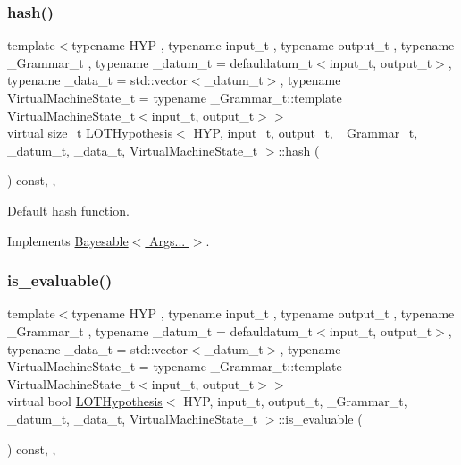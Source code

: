 \mbox{\label{class_l_o_t_hypothesis_a7c33d51f8d81762b1eca7f86b596236a}} 
\subsubsection{\texorpdfstring{hash()}{hash()}}
{\footnotesize\ttfamily template$<$typename H\+YP , typename input\+\_\+t , typename output\+\_\+t , typename \+\_\+\+Grammar\+\_\+t , typename \+\_\+datum\+\_\+t  = defauldatum\+\_\+t$<$input\+\_\+t, output\+\_\+t$>$, typename \+\_\+data\+\_\+t  = std\+::vector$<$\+\_\+datum\+\_\+t$>$, typename Virtual\+Machine\+State\+\_\+t  = typename \+\_\+\+Grammar\+\_\+t\+::template Virtual\+Machine\+State\+\_\+t$<$input\+\_\+t, output\+\_\+t$>$$>$ \\
virtual size\+\_\+t \hyperlink{class_l_o_t_hypothesis}{L\+O\+T\+Hypothesis}$<$ H\+YP, input\+\_\+t, output\+\_\+t, \+\_\+\+Grammar\+\_\+t, \+\_\+datum\+\_\+t, \+\_\+data\+\_\+t, Virtual\+Machine\+State\+\_\+t $>$\+::hash (\begin{DoxyParamCaption}{ }\end{DoxyParamCaption}) const\hspace{0.3cm}{\ttfamily [inline]}, {\ttfamily [override]}, {\ttfamily [virtual]}}



Default hash function. 



Implements \hyperlink{class_bayesable_a26f6d55e7526ebd897cbb27c757b611b}{Bayesable$<$ Args... $>$}.

\mbox{\label{class_l_o_t_hypothesis_a9eeaaf321324d2418405f4d7252f6ca4}} 
\subsubsection{\texorpdfstring{is\+\_\+evaluable()}{is\_evaluable()}}
{\footnotesize\ttfamily template$<$typename H\+YP , typename input\+\_\+t , typename output\+\_\+t , typename \+\_\+\+Grammar\+\_\+t , typename \+\_\+datum\+\_\+t  = defauldatum\+\_\+t$<$input\+\_\+t, output\+\_\+t$>$, typename \+\_\+data\+\_\+t  = std\+::vector$<$\+\_\+datum\+\_\+t$>$, typename Virtual\+Machine\+State\+\_\+t  = typename \+\_\+\+Grammar\+\_\+t\+::template Virtual\+Machine\+State\+\_\+t$<$input\+\_\+t, output\+\_\+t$>$$>$ \\
virtual bool \hyperlink{class_l_o_t_hypothesis}{L\+O\+T\+Hypothesis}$<$ H\+YP, input\+\_\+t, output\+\_\+t, \+\_\+\+Grammar\+\_\+t, \+\_\+datum\+\_\+t, \+\_\+data\+\_\+t, Virtual\+Machine\+State\+\_\+t $>$\+::is\+\_\+evaluable (\begin{DoxyParamCaption}{ }\end{DoxyParamCaption}) const\hspace{0.3cm}{\ttfamily [inline]}, {\ttfamily [override]}, {\ttfamily [virtual]}}



